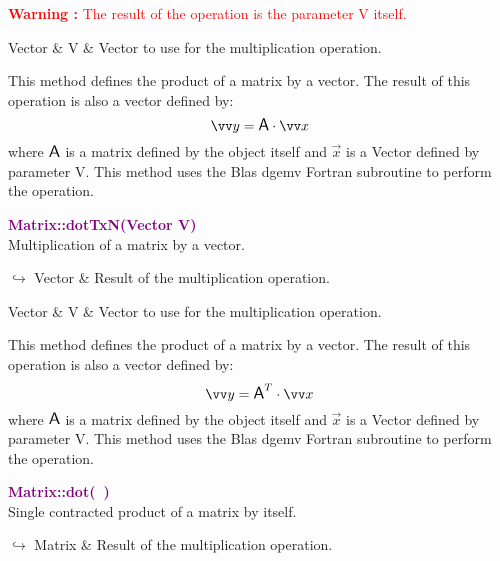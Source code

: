 \hspace*{10mm}\textcolor{red}{\textbf{Warning :}  The result of the operation is the parameter V itself.}

\begin{tcolorbox}[width=\textwidth,myArgs,tabularx={ll|R}]
Vector & V & Vector to use for the multiplication operation.
\end{tcolorbox}

This method defines the product of a matrix by a vector.
The result of this operation is also a vector defined by:
\begin{equation*}
\overrightarrow{y} = \A \cdot \overrightarrow{x}
\end{equation*}
where $\mbox{\large\ensuremath{\mathsf{A}}}$ is a matrix defined by the object itself and $\overrightarrow{x}$ is a Vector defined by parameter V.
This method uses the Blas \textsf{dgemv} Fortran subroutine to perform the operation.

\textcolor{purple}{\textbf{Matrix::dotTxN(Vector V)}}\label{Matrix::dotTxN(Vector V)}\\
Multiplication of a matrix by a vector.\vspace*{-0.5em}
\begin{tcolorbox}[grow to left by=-1cm, width=\textwidth-1cm,myArgs,tabularx={l|R}]
$\hookrightarrow$ Vector & Result of the multiplication operation.
\end{tcolorbox}

\begin{tcolorbox}[width=\textwidth,myArgs,tabularx={ll|R}]
Vector & V & Vector to use for the multiplication operation.
\end{tcolorbox}

This method defines the product of a matrix by a vector.
The result of this operation is also a vector defined by:
\begin{equation*}
\overrightarrow{y} = \A^T \cdot \overrightarrow{x}
\end{equation*}
where $\mbox{\large\ensuremath{\mathsf{A}}}$ is a matrix defined by the object itself and $\overrightarrow{x}$ is a Vector defined by parameter V.
This method uses the Blas \textsf{dgemv} Fortran subroutine to perform the operation.

\textcolor{purple}{\textbf{Matrix::dot(~)}}\label{Matrix::dot()}\\
Single contracted product of a matrix by itself.\vspace*{-0.5em}
\begin{tcolorbox}[grow to left by=-1cm, width=\textwidth-1cm,myArgs,tabularx={l|R}]
$\hookrightarrow$ Matrix & Result of the multiplication operation.
\end{tcolorbox}

